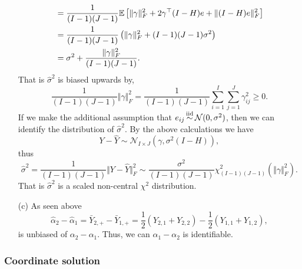 \begin{enumerate}
\begin{align*}
		&=\frac{1}{(I-1)(J-1)}{\mathbb E}\left[\Vert \gamma \Vert_F^2 + 2\gamma^\top  (I-H)e + \Vert (I-H)e\Vert_F^2 \right] \\
		&=\frac{1}{(I-1)(J-1)}\left(\Vert \gamma \Vert_F^2 + (I-1)(J-1)\sigma^2\right)\\
		&=\sigma^2 + \frac{\Vert \gamma \Vert_F^2}{(I-1)(J-1)}.
	\end{align*}
	That is $\hat{\sigma}^2$ is biased upwards by,
	\[\frac{1}{(I-1)(J-1)} \Vert \gamma \Vert_F^2 = \frac{1}{(I-1)(J-1)}\sum_{i=1}^I\sum_{j=1}^J \gamma_{ij}^2 \ge 0. \]
	If we make the additional assumption that $e_{ij} \simiid \mathcal{N}(0,\sigma^2)$, then we can identify the distribution of $\hat{\sigma}^2$. By the above calculations we have 
	\[Y-\hat{Y} \sim \mathcal{N}_{I \times J}(\gamma, \sigma^2(I-H)), \]
	thus 
	\[\hat{\sigma}^2 = \frac{1}{(I-1)(J-1)}\Vert Y-\hat{Y}\Vert_F^2 \sim \frac{\sigma^2}{(I-1)(J-1)} \chi^2_{(I-1)(J-1)}(\Vert \gamma \Vert_F^2).\] 
	That is $\hat{\sigma}^2$ is a scaled non-central $\chi^2$ distribution.
	\item[(c)] As seen above
	\[\hat{\alpha}_2 - \hat{\alpha}_1 = \bar{Y}_{2,+} - \bar{Y}_{1,+} = \frac{1}{2}\left(Y_{2,1}+Y_{2,2}\right) - \frac{1}{2}\left(Y_{1,1}+Y_{1,2}\right), \]
	is unbiased of $\alpha_2 - \alpha_1$. Thus, we can $\alpha_1 - \alpha_2$ is identifiable. 
\end{enumerate}


\subsubsection*{Coordinate solution}

